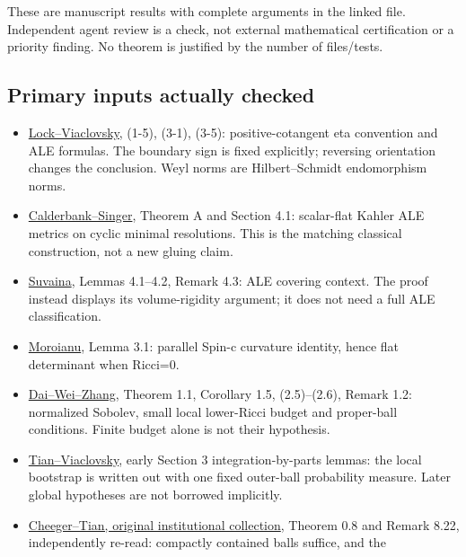 \documentclass[
  10pt,
]{article}
\providecommand{\tightlist}{%
  \setlength{\itemsep}{0pt}\setlength{\parskip}{0pt}}
\begin{document}
These are manuscript results with complete arguments in the linked file.
Independent agent review is a check, not external mathematical
certification or a priority finding. No theorem is justified by the
number of files/tests.

\hypertarget{primary-inputs-actually-checked}{%
\subsection{Primary inputs actually
checked}\label{primary-inputs-actually-checked}}

\begin{itemize}
\tightlist
\item
  \href{https://msp.org/gt/2016/20-3/gt-v20-n3-p13-s.pdf}{Lock--Viaclovsky},
  (1-5), (3-1), (3-5): positive-cotangent eta convention and ALE
  formulas. The boundary sign is fixed explicitly; reversing orientation
  changes the conclusion. Weyl norms are Hilbert--Schmidt endomorphism
  norms.
\item
  \href{https://arxiv.org/pdf/math/0206229}{Calderbank--Singer}, Theorem
  A and Section 4.1: scalar-flat Kahler ALE metrics on cyclic minimal
  resolutions. This is the matching classical construction, not a new
  gluing claim.
\item
  \href{https://arxiv.org/pdf/1102.2672}{Suvaina}, Lemmas 4.1--4.2,
  Remark 4.3: ALE covering context. The proof instead displays its
  volume-rigidity argument; it does not need a full ALE classification.
\item
  \href{https://moroianu.perso.math.cnrs.fr/tex/1997cmp.pdf}{Moroianu},
  Lemma 3.1: parallel Spin-c curvature identity, hence flat determinant
  when Ricci=0.
\item
  \href{https://web.math.ucsb.edu/~wei/paper/Dai-Wei-Zhang.pdf}{Dai--Wei--Zhang},
  Theorem 1.1, Corollary 1.5, (2.5)--(2.6), Remark 1.2: normalized
  Sobolev, small local lower-Ricci budget and proper-ball conditions.
  Finite budget alone is not their hypothesis.
\item
  \href{https://arxiv.org/pdf/math/0310302}{Tian--Viaclovsky}, early
  Section 3 integration-by-parts lemmas: the local bootstrap is written
  out with one fixed outer-ball probability measure. Later global
  hypotheses are not borrowed implicitly.
\item
  \href{https://www.math.stonybrook.edu/Courses/MAT683/201001/MAT683S10.pdf}{Cheeger--Tian,
  original institutional collection}, Theorem 0.8 and Remark 8.22,
  independently re-read: compactly contained balls suffice, and the

\end{itemize}
\end{document}
